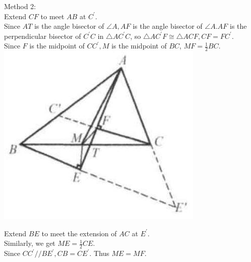 \documentclass{article}
\begin{document}
Method 2:\\
Extend \(C F\) to meet \(A B\) at \(C^{\prime}\).\\
Since \(A T\) is the angle bisector of \(\angle A, A F\) is the angle bisector of \(\angle A . A F\) is the perpendicular bisector of \(C^{\prime} C\) in \(\triangle A C^{\prime} C\), so \(\triangle A C^{\prime} F \cong \triangle A C F, C F=F C^{\prime}\).\\
Since \(F\) is the midpoint of \(C C^{\prime}, M\) is the midpoint of \(B C\), \(M F=\frac{1}{2} B C\).\\
\centering
\includegraphics[width=\textwidth]{images/069.jpg}

Extend \(B E\) to meet the extension of \(A C\) at \(E^{\prime}\).\\
Similarly, we get \(M E=\frac{1}{2} C E\).\\
Since \(C C^{\prime} / / B E^{\prime}, C B=C E^{\prime}\). Thus \(M E=M F\).
\end{document}
